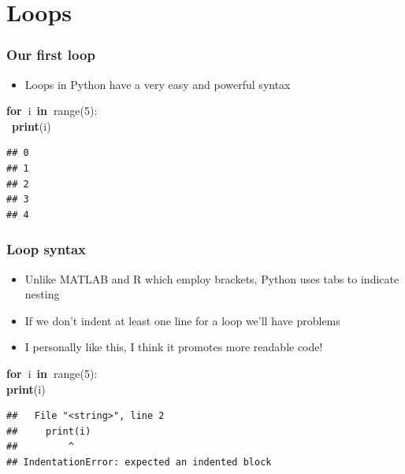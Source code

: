 \documentclass{beamer}\usepackage[]{graphicx}\usepackage[]{color}
\makeatletter
\newcommand{\hlnum}[1]{\textcolor[rgb]{0.686,0.059,0.569}{#1}}%
\newcommand{\hlopt}[1]{\textcolor[rgb]{0,0,0}{#1}}%
\newcommand{\hlstd}[1]{\textcolor[rgb]{0.345,0.345,0.345}{#1}}%
\newcommand{\hlkwa}[1]{\textcolor[rgb]{0.161,0.373,0.58}{\textbf{#1}}}%
\newcommand{\hlkwb}[1]{\textcolor[rgb]{0.69,0.353,0.396}{#1}}%
\newenvironment{kframe}{%
 \def\at@end@of@kframe{}%
 \ifinner\ifhmode%
  \def\at@end@of@kframe{\end{minipage}}%
  \begin{minipage}{\columnwidth}%
 \fi\fi%
 \def\FrameCommand##1{\hskip\@totalleftmargin \hskip-\fboxsep
 \colorbox{shadecolor}{##1}\hskip-\fboxsep
     \hskip-\linewidth \hskip-\@totalleftmargin \hskip\columnwidth}%
 \MakeFramed {\advance\hsize-\width
   \@totalleftmargin\z@ \linewidth\hsize
   \@setminipage}}%
 {\par\unskip\endMakeFramed%
 \at@end@of@kframe}
\newenvironment{knitrout}{}{} %
\makeatother
\begin{document}
\section{Loops}

\begin{frame}[fragile]
\frametitle{Our first loop}
\begin{itemize}
	\item Loops in Python have a very easy and powerful syntax

\end{itemize}
\begin{knitrout}
\color{fgcolor}\begin{kframe}
\noindent
\ttfamily
\hlstd{}\hlkwa{for\ }\hlstd{i\ }\hlkwa{in\ }\hlstd{}\hlkwb{range}\hlstd{}\hlopt{(}\hlstd{}\hlnum{5}\hlstd{}\hlopt{):}\hspace*{\fill}\\
\hlstd{\ }\hlkwa{print}\hlstd{}\hlopt{(}\hlstd{i}\hlopt{)}\hlstd{}\hspace*{\fill}
\mbox{}
\normalfont

\begin{verbatim}
## 0
## 1
## 2
## 3
## 4
\end{verbatim}
\end{kframe}
\end{knitrout}

\end{frame}

\begin{frame}[fragile]
\frametitle{Loop syntax}
\begin{itemize}
	\item Unlike MATLAB and R which employ brackets, Python uses tabs to indicate nesting

	\item If we don't indent at least one line for a loop we'll have problems

	\item I personally like this, I think it promotes more readable code!

\end{itemize}
\begin{knitrout}
\color{fgcolor}\begin{kframe}
\noindent
\ttfamily
\hlstd{}\hlkwa{for\ }\hlstd{i\ }\hlkwa{in\ }\hlstd{}\hlkwb{range}\hlstd{}\hlopt{(}\hlstd{}\hlnum{5}\hlstd{}\hlopt{):}\hspace*{\fill}\\
\hlstd{}\hlkwa{print}\hlstd{}\hlopt{(}\hlstd{i}\hlopt{)}\hlstd{}\hspace*{\fill}
\mbox{}
\normalfont

\begin{verbatim}
##   File "<string>", line 2
##     print(i)
##         ^
## IndentationError: expected an indented block
\end{verbatim}
\end{kframe}
\end{knitrout}

\end{frame}
\end{document}
